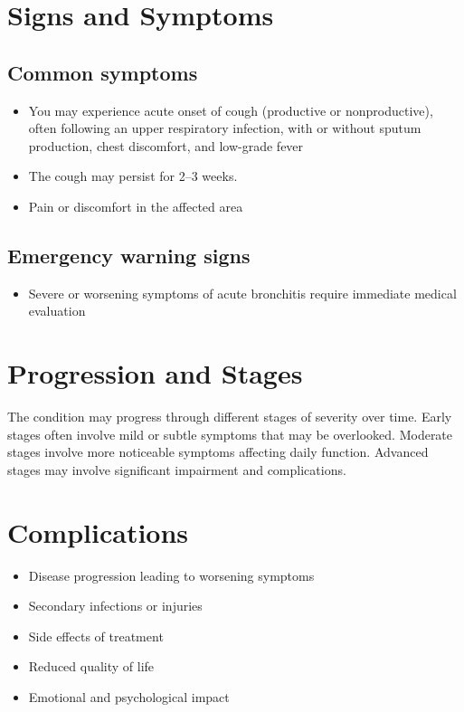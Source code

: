 \section{Signs and Symptoms}

\subsection{Common symptoms}
\begin{itemize}[noitemsep]
  \item You may experience acute onset of cough (productive or nonproductive), often following an upper respiratory infection, with or without sputum production, chest discomfort, and low-grade fever
  \item The cough may persist for 2--3 weeks.
  \item Pain or discomfort in the affected area
  \end{itemize}

\subsection{Emergency warning signs}
\begin{itemize}[noitemsep]
  \item Severe or worsening symptoms of acute bronchitis require immediate medical evaluation
\end{itemize}
\section{Progression and Stages}
The condition may progress through different stages of severity over time. Early stages often involve mild or subtle symptoms that may be overlooked. Moderate stages involve more noticeable symptoms affecting daily function. Advanced stages may involve significant impairment and complications.
\section{Complications}
\begin{itemize}[noitemsep]
  \item Disease progression leading to worsening symptoms
  \item Secondary infections or injuries
  \item Side effects of treatment
  \item Reduced quality of life
  \item Emotional and psychological impact
\end{itemize}
